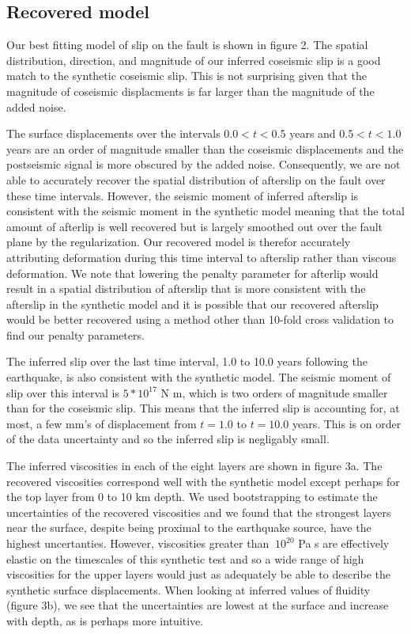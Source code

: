 \documentclass[12pt]{article}
\begin{document}
\subsection{Recovered model}

Our best fitting model of slip on the fault is shown in figure 2.  The
spatial distribution, direction, and magnitude of our inferred
coseismic slip is a good match to the synthetic coseismic slip.  This
is not surprising given that the magnitude of coseismic displacments
is far larger than the magnitude of the added noise. 

The surface displacements over the intervals $0.0<t<0.5$ years and
$0.5<t<1.0$ years are an order of magnitude smaller than the coseismic
displacements and the postseismic signal is more obscured by the added
noise.  Consequently, we are not able to accurately recover the
spatial distribution of afterslip on the fault over these time
intervals.  However, the seismic moment of inferred afterslip is
consistent with the seismic moment in the synthetic model meaning that
the total amount of afterlip is well recovered but is largely smoothed
out over the fault plane by the regularization.  Our recovered model
is therefor accurately attributing deformation during this time
interval to afterslip rather than viscous deformation. We note that
lowering the penalty parameter for afterlip would result in a spatial
distribution of afterslip that is more consistent with the afterslip
in the synthetic model and it is possible that our recovered afterslip
would be better recovered using a method other than 10-fold cross
validation to find our penalty parameters.

The inferred slip over the last time interval, 1.0 to 10.0 years
following the earthquake, is also consistent with the synthetic model.
The seismic moment of slip over this interval is $5*10^{17}$ N m,
which is two orders of magnitude smaller than for the coseismic slip.
This means that the inferred slip is accounting for, at most, a few mm's
of displacement from $t=1.0$ to $t=10.0$ years.  This is on order of the
data uncertainty and so the inferred slip is negligably small.  

The inferred viscosities in each of the eight layers are shown in
figure 3a.  The recovered viscosities correspond well with the
synthetic model except perhaps for the top layer from 0 to 10 km
depth.  We used bootstrapping to estimate the uncertainties of the
recovered viscosities and we found that the strongest layers near the
surface, despite being proximal to the earthquake source, have the
highest uncertanties.  However, viscosities greater than $~10^{20}$ Pa s are
effectively elastic on the timescales of this synthetic test and so a
wide range of high viscosities for the upper layers would just as
adequately be able to describe the synthetic surface displacements.
When looking at inferred values of fluidity (figure 3b), we see that
the uncertainties are lowest at the surface and increase with depth,
as is perhaps more intuitive.
\end{document}
